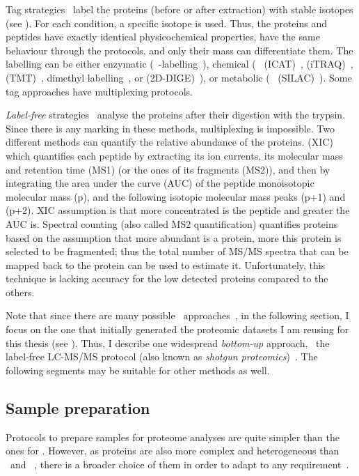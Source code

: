 Tag strategies~ label the proteins (before or after extraction)
with stable isotopes (see ).
For each condition, a specific isotope is used.
Thus, the proteins and peptides
have exactly identical physicochemical properties,
have the same behaviour through the protocols, and
only their mass can differentiate them.
The labelling can be either
enzymatic (\eg\ -labelling~),
chemical (\eg\  (\gls{ICAT})~,
 (\gls{iTRAQ})~,
 (\gls{TMT})~,
dimethyl labelling~,
or  (\gls{2D-DIGE})~),
or metabolic (\eg\  (\gls{SILAC})~).
Some tag approaches have multiplexing protocols.

\emph{Label-free} strategies~
analyse the proteins after their digestion with the trypsin.
Since there is any marking in these methods, multiplexing is impossible.
Two different methods can quantify the relative abundance of the proteins.
 (\gls{XIC})~
which quantifies each peptide by extracting its ion currents,
its molecular mass and retention time (MS1) (or the ones of its fragments (MS2)),
and then by integrating the area under the curve (\gls{AUC}) of the peptide
monoisotopic molecular mass (p),
and the following isotopic molecular mass peaks (p+1) and (p+2).
\gls{XIC} assumption is that more concentrated is the peptide and
greater the \gls{AUC} is.
Spectral counting (also called MS2 quantification)
quantifies proteins based on the assumption that
more abundant is a protein, more this protein is selected to be fragmented;
thus the total number of \gls{MS/MS} spectra that can be mapped back to
the protein can be used to estimate it.
Unfortunately, this technique is lacking accuracy for the low detected proteins
compared to the others.

Note that since there are many possible \ms\ approaches~,
in the following section, I focus on the one
that initially generated the proteomic datasets
I am reusing for this thesis (see ).
Thus, I describe one widespread \emph{bottom-up} approach,
\ie\ the label-free \gls{LC-MS/MS} protocol
(also known as \emph{shotgun proteomics})~.
The following segments may be suitable for other methods as well.

\subsection{Sample preparation}\label{subsec:ProtSampPrep}
Protocols to prepare samples for proteome analyses are quite simpler than the
ones for \Rnaseq. However, as proteins are also more complex and heterogeneous
than \DNA\ and \RNA~, there is a broader choice of them
in order to adapt to any requirement~.

